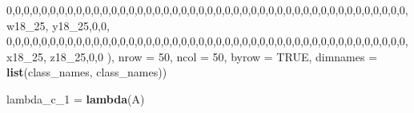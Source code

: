 \documentclass[]{article}
\newenvironment{Shaded}{\begin{snugshade}}{\end{snugshade}}
\newcommand{\DataTypeTok}[1]{\textcolor[rgb]{0.13,0.29,0.53}{#1}}
\newcommand{\DecValTok}[1]{\textcolor[rgb]{0.00,0.00,0.81}{#1}}
\newcommand{\KeywordTok}[1]{\textcolor[rgb]{0.13,0.29,0.53}{\textbf{#1}}}
\newcommand{\NormalTok}[1]{#1}
\newcommand{\OtherTok}[1]{\textcolor[rgb]{0.56,0.35,0.01}{#1}}
\newcommand{\StringTok}[1]{\textcolor[rgb]{0.31,0.60,0.02}{#1}}
\begin{document}
\begin{Shaded}
\begin{Highlighting}[]
\DecValTok{0}\NormalTok{,}\DecValTok{0}\NormalTok{,}\DecValTok{0}\NormalTok{,}\DecValTok{0}\NormalTok{,}\DecValTok{0}\NormalTok{,}\DecValTok{0}\NormalTok{,}\DecValTok{0}\NormalTok{,}\DecValTok{0}\NormalTok{,}\DecValTok{0}\NormalTok{,}\DecValTok{0}\NormalTok{,}\DecValTok{0}\NormalTok{,}\DecValTok{0}\NormalTok{,}\DecValTok{0}\NormalTok{,}\DecValTok{0}\NormalTok{,}\DecValTok{0}\NormalTok{,}\DecValTok{0}\NormalTok{,}\DecValTok{0}\NormalTok{,}\DecValTok{0}\NormalTok{,}\DecValTok{0}\NormalTok{,}\DecValTok{0}\NormalTok{,}\DecValTok{0}\NormalTok{,}\DecValTok{0}\NormalTok{,}\DecValTok{0}\NormalTok{,}\DecValTok{0}\NormalTok{,}\DecValTok{0}\NormalTok{,}\DecValTok{0}\NormalTok{,}\DecValTok{0}\NormalTok{,}\DecValTok{0}\NormalTok{,}\DecValTok{0}\NormalTok{,}\DecValTok{0}\NormalTok{,}\DecValTok{0}\NormalTok{,}\DecValTok{0}\NormalTok{,}\DecValTok{0}\NormalTok{,}\DecValTok{0}\NormalTok{,}\DecValTok{0}\NormalTok{,}\DecValTok{0}\NormalTok{,}\DecValTok{0}\NormalTok{,}\DecValTok{0}\NormalTok{,}\DecValTok{0}\NormalTok{,}\DecValTok{0}\NormalTok{,}\DecValTok{0}\NormalTok{,}\DecValTok{0}\NormalTok{,}\DecValTok{0}\NormalTok{,}\DecValTok{0}\NormalTok{,}\DecValTok{0}\NormalTok{,}\DecValTok{0}\NormalTok{,w18_}\DecValTok{25}\NormalTok{, y18_}\DecValTok{25}\NormalTok{,}\DecValTok{0}\NormalTok{,}\DecValTok{0}\NormalTok{,}
\DecValTok{0}\NormalTok{,}\DecValTok{0}\NormalTok{,}\DecValTok{0}\NormalTok{,}\DecValTok{0}\NormalTok{,}\DecValTok{0}\NormalTok{,}\DecValTok{0}\NormalTok{,}\DecValTok{0}\NormalTok{,}\DecValTok{0}\NormalTok{,}\DecValTok{0}\NormalTok{,}\DecValTok{0}\NormalTok{,}\DecValTok{0}\NormalTok{,}\DecValTok{0}\NormalTok{,}\DecValTok{0}\NormalTok{,}\DecValTok{0}\NormalTok{,}\DecValTok{0}\NormalTok{,}\DecValTok{0}\NormalTok{,}\DecValTok{0}\NormalTok{,}\DecValTok{0}\NormalTok{,}\DecValTok{0}\NormalTok{,}\DecValTok{0}\NormalTok{,}\DecValTok{0}\NormalTok{,}\DecValTok{0}\NormalTok{,}\DecValTok{0}\NormalTok{,}\DecValTok{0}\NormalTok{,}\DecValTok{0}\NormalTok{,}\DecValTok{0}\NormalTok{,}\DecValTok{0}\NormalTok{,}\DecValTok{0}\NormalTok{,}\DecValTok{0}\NormalTok{,}\DecValTok{0}\NormalTok{,}\DecValTok{0}\NormalTok{,}\DecValTok{0}\NormalTok{,}\DecValTok{0}\NormalTok{,}\DecValTok{0}\NormalTok{,}\DecValTok{0}\NormalTok{,}\DecValTok{0}\NormalTok{,}\DecValTok{0}\NormalTok{,}\DecValTok{0}\NormalTok{,}\DecValTok{0}\NormalTok{,}\DecValTok{0}\NormalTok{,}\DecValTok{0}\NormalTok{,}\DecValTok{0}\NormalTok{,}\DecValTok{0}\NormalTok{,}\DecValTok{0}\NormalTok{,}\DecValTok{0}\NormalTok{,}\DecValTok{0}\NormalTok{,x18_}\DecValTok{25}\NormalTok{, z18_}\DecValTok{25}\NormalTok{,}\DecValTok{0}\NormalTok{,}\DecValTok{0}
\NormalTok{),  }
\DataTypeTok{nrow =} \DecValTok{50}\NormalTok{, }\DataTypeTok{ncol =} \DecValTok{50}\NormalTok{, }\DataTypeTok{byrow =} \OtherTok{TRUE}\NormalTok{, }\DataTypeTok{dimnames =} \KeywordTok{list}\NormalTok{(class_names, class_names))}

\NormalTok{lambda_c_}\DecValTok{1}\NormalTok{ =}\StringTok{ }\KeywordTok{lambda}\NormalTok{(A)}
\end{Highlighting}
\end{Shaded}
\end{document}
